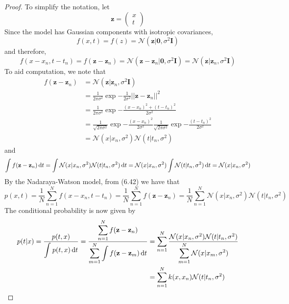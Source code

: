 \begin{proof}
To simplify the notation, let
    \[
        \mathbf{z} = \begin{pmatrix}
            x \\
            t
        \end{pmatrix}
    \] 
Since the model has Gaussian components with isotropic covariances,
    \[
        f(x, t) = f(z) = \mathcal{N}(\mathbf{z} | \mathbf{0}, \sigma^2 \mathbf{I})
    \] 
and therefore,
    \[
        f(x - x_n, t - t_n) 
        = f(\mathbf{z} - \mathbf{z}_n) 
        = \mathcal{N}(\mathbf{z} - \mathbf{z}_n | \mathbf{0}, \sigma^2 \mathbf{I})
        = \mathcal{N}(\mathbf{z} | \mathbf{z}_n, \sigma^2 \mathbf{I})
    \] 
To aid computation, we note that
\begin{align*}
    f(\mathbf{z} - \mathbf{z}_n) 
    &= \mathcal{N}(\mathbf{z} | \mathbf{z}_n, \sigma^2 \mathbf{I}) \\
    &= \frac{1}{2 \pi \sigma^2} \exp{-\frac{1}{2\sigma^2} ||\mathbf{z} - \mathbf{z}_n||^2} \\
    &= \frac{1}{2 \pi \sigma^2} \exp{-\frac{(x - x_n)^2 + (t - t_n)^2}{2\sigma^2}} \\
    &= \frac{1}{\sqrt{2\pi\sigma^2}} \exp{-\frac{(x - x_n)^2}{2\sigma^2}}
    \frac{1}{\sqrt{2\pi\sigma^2}} \exp{-\frac{(t - t_n)^2}{2\sigma^2}} \\
    &= \mathcal{N}(x | x_n, \sigma^2) \mathcal{N}(t | t_n, \sigma^2)
\end{align*}
and
\[
    \int f(\mathbf{z} - \mathbf{z}_n) \mathop{}\!\mathrm{d} t
    = \int \mathcal{N}(x | x_n, \sigma^2) \mathcal{N}(t | t_n, \sigma^2) \mathop{}\!\mathrm{d} t
    = \mathcal{N}(x | x_n, \sigma^2) \int \mathcal{N}(t | t_n, \sigma^2) \mathop{}\!\mathrm{d} t
    = \mathcal{N}(x | x_n, \sigma^2)
\] 
By the Nadaraya-Watson model, from (6.42) we have that
\[
    p(x, t) = \frac{1}{N} \sum_{n=1}^{N} f(x - x_n, t - t_n)
    = \frac{1}{N} \sum_{n=1}^{N} f(\mathbf{z} - \mathbf{z}_n) 
    = \frac{1}{N} \sum_{n=1}^{N} \mathcal{N}(x | x_n, \sigma^2) \mathcal{N}(t | t_n, \sigma^2)
\] 
The conditional probability is now given by
\begin{align*}
    p(t | x) = \frac{p(t, x)}{\displaystyle \int_{}^{} p(t, x) \diff t}
    = \frac{\displaystyle \sum_{n=1}^{N} f(\mathbf{z} - \mathbf{z}_n)}
    {\displaystyle \sum_{m=1}^{N} \int f(\mathbf{z} - \mathbf{z}_m) \diff t}
    &= \sum_{n=1}^{N} \frac{\mathcal{N}(x | x_n, \sigma^2) \mathcal{N}(t | t_n, \sigma^2)}
    {\displaystyle \sum_{m=1}^{N} \mathcal{N}(x | x_m, \sigma^2)} \\
    &= \sum_{n=1}^{N} k(x, x_n) \mathcal{N}(t | t_n, \sigma^2)

\end{align*}
\end{proof}
